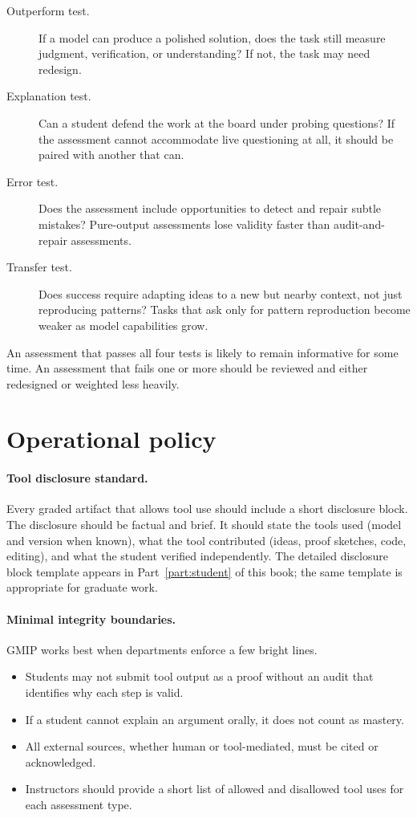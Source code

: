 \documentclass{SIAMbook2023}
\begin{document}
\begin{description}
\item[Outperform test.] If a model can produce a polished solution, does the task still measure judgment, verification, or understanding? If not, the task may need redesign.

\item[Explanation test.] Can a student defend the work at the board under probing questions? If the assessment cannot accommodate live questioning at all, it should be paired with another that can.

\item[Error test.] Does the assessment include opportunities to detect and repair subtle mistakes? Pure-output assessments lose validity faster than audit-and-repair assessments.

\item[Transfer test.] Does success require adapting ideas to a new but nearby context, not just reproducing patterns? Tasks that ask only for pattern reproduction become weaker as model capabilities grow.
\end{description}

An assessment that passes all four tests is likely to remain informative for some time. An assessment that fails one or more should be reviewed and either redesigned or weighted less heavily.

\section{Operational policy}

\paragraph{Tool disclosure standard.}
Every graded artifact that allows tool use should include a short disclosure block. The disclosure should be factual and brief. It should state the tools used (model and version when known), what the tool contributed (ideas, proof sketches, code, editing), and what the student verified independently. The detailed disclosure block template appears in Part~\ref{part:student} of this book; the same template is appropriate for graduate work.

\paragraph{Minimal integrity boundaries.}
GMIP works best when departments enforce a few bright lines.
\begin{itemize}
\item Students may not submit tool output as a proof without an audit that identifies why each step is valid.
\item If a student cannot explain an argument orally, it does not count as mastery.
\item All external sources, whether human or tool-mediated, must be cited or acknowledged.
\item Instructors should provide a short list of allowed and disallowed tool uses for each assessment type.
\end{itemize}
\end{document}

